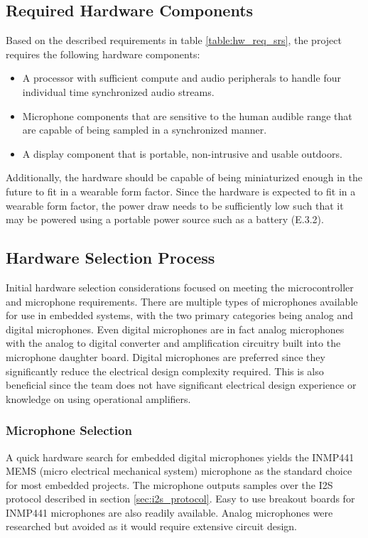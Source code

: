 \documentclass[12pt, titlepage]{article}
\begin{document}
\subsection{Required Hardware Components}
Based on the described requirements in table \ref{table:hw_req_srs}, the project
requires the following hardware components:

\begin{itemize}
    \item A processor with sufficient compute and audio peripherals to handle
    four individual time synchronized audio streams.
    \item Microphone components that are sensitive to the human audible range
    that are capable of being sampled in a synchronized manner.
    \item A display component that is portable, non-intrusive and usable
    outdoors. 
\end{itemize}

Additionally, the hardware should be capable of being miniaturized enough in the
future to fit in a wearable form factor. Since the hardware is expected to fit
in a wearable form factor, the power draw needs to be sufficiently low such that
it may be powered using a portable power source such as a battery (E.3.2).  

\subsection{Hardware Selection Process}


Initial hardware selection considerations focused on meeting the microcontroller
and microphone requirements. There are multiple types of microphones available
for use in embedded systems, with the two primary categories being analog and
digital microphones. Even digital microphones are in fact analog microphones
with the analog to digital converter and amplification circuitry built into the
microphone daughter board. Digital microphones are preferred since they
significantly reduce the electrical design complexity required. This is also
beneficial since the team does not have significant electrical design experience
or knowledge on using operational amplifiers. 

\subsubsection{Microphone Selection}
A quick hardware search for embedded digital microphones yields the INMP441 MEMS
(micro electrical mechanical system) microphone as the standard choice for most
embedded projects. The microphone outputs samples over the I2S protocol
described in section \ref{sec:i2s_protocol}. Easy to use breakout boards for
INMP441 microphones are also readily available. Analog microphones were
researched but avoided as it would require extensive circuit design. 
\end{document}
